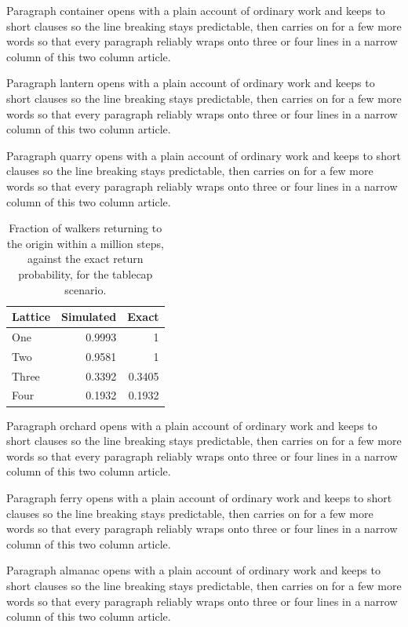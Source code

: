 \documentclass[twocolumn]{article}
\begin{document}
Paragraph container opens with a plain account of ordinary work and keeps to short
clauses so the line breaking stays predictable, then carries on for a few more
words so that every paragraph reliably wraps onto three or four lines in a
narrow column of this two column article.

Paragraph lantern opens with a plain account of ordinary work and keeps to short
clauses so the line breaking stays predictable, then carries on for a few more
words so that every paragraph reliably wraps onto three or four lines in a
narrow column of this two column article.

Paragraph quarry opens with a plain account of ordinary work and keeps to short
clauses so the line breaking stays predictable, then carries on for a few more
words so that every paragraph reliably wraps onto three or four lines in a
narrow column of this two column article.

\begin{table}[b]
\centering
\begin{tabular}{lrr}
\hline
Lattice & Simulated & Exact \\
\hline
One & 0.9993 & 1 \\
Two & 0.9581 & 1 \\
Three & 0.3392 & 0.3405 \\
Four & 0.1932 & 0.1932 \\
\hline
\end{tabular}
\caption{Fraction of walkers returning to the origin within a million steps,
against the exact return probability, for the tablecap scenario.}
\end{table}

Paragraph orchard opens with a plain account of ordinary work and keeps to short
clauses so the line breaking stays predictable, then carries on for a few more
words so that every paragraph reliably wraps onto three or four lines in a
narrow column of this two column article.

Paragraph ferry opens with a plain account of ordinary work and keeps to short
clauses so the line breaking stays predictable, then carries on for a few more
words so that every paragraph reliably wraps onto three or four lines in a
narrow column of this two column article.

Paragraph almanac opens with a plain account of ordinary work and keeps to short
clauses so the line breaking stays predictable, then carries on for a few more
words so that every paragraph reliably wraps onto three or four lines in a
narrow column of this two column article.
\end{document}
